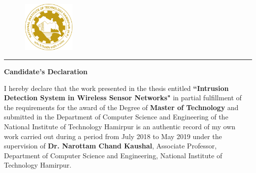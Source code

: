 \graphicspath{{Figures/PNG/}{Figures/}}
\vspace{-4.5\baselineskip}
\begin{figure}[htbp]
	\includegraphics[height=2.5cm,width=2.7cm]{NIT-Logo.png}
\end{figure}
\vspace{-5.0\baselineskip}
\begin{center} 
\end{center}
\noindent\rule{\linewidth}{2pt}
\begin{center}
{\bf\Large \hspace{1cm} Candidate's Declaration }\\
\par\vspace{5mm}
\end{center}
\noindent I hereby declare that the work presented in the thesis entitled \textbf{``Intrusion Detection System in Wireless Sensor Networks"} in partial fulfillment of the requirements for the award of the Degree of \textbf{Master of Technology} and submitted in the Department of Computer Science and Engineering of the National Institute of Technology Hamirpur is an authentic record of my own work carried out during a period from July 2018 to May 2019 under the supervision of  \textbf{Dr. Narottam Chand Kaushal}, Associate Professor, Department of Computer Science and Engineering, National Institute of Technology Hamirpur.
